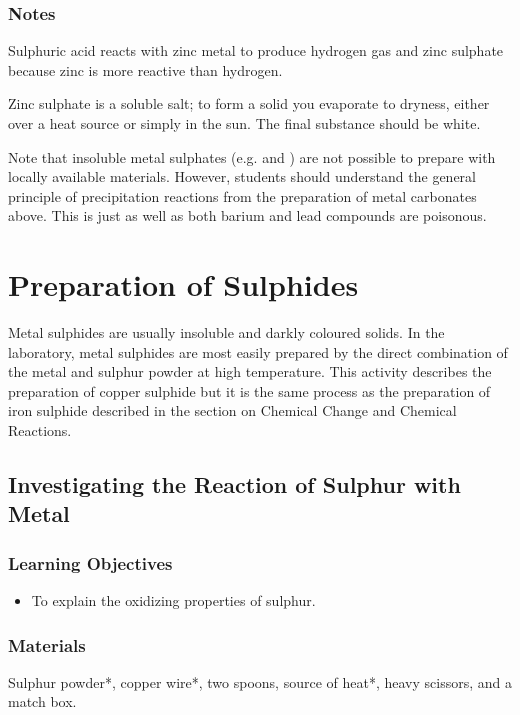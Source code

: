 \subsubsection*{Notes}
Sulphuric acid reacts with zinc metal to produce hydrogen gas and zinc sulphate because zinc is more reactive than hydrogen.

Zinc sulphate is a soluble salt; to form a solid you evaporate to dryness, either over a heat source or simply in the sun. The final substance should be white.

Note that insoluble metal sulphates (e.g.  and ) are not possible to prepare with locally available materials. However, students should understand the general principle of precipitation reactions from the preparation of metal carbonates above. This is just as well as both barium and lead compounds are poisonous.

\section{Preparation of Sulphides}

Metal sulphides are usually insoluble and darkly coloured solids. In the laboratory, metal sulphides are most easily prepared by the direct combination of the metal and sulphur powder at high temperature. This activity describes the preparation of copper sulphide but it is the same process as the preparation of iron sulphide described in the section on Chemical Change and Chemical Reactions.

\subsection{Investigating the Reaction of Sulphur with Metal}

\subsubsection*{Learning Objectives}
\begin{itemize}
\item{To explain the oxidizing properties of sulphur.}
\end{itemize}

\subsubsection*{Materials}
Sulphur powder*, copper wire*, two spoons, source of heat*, heavy scissors, and a match box.

